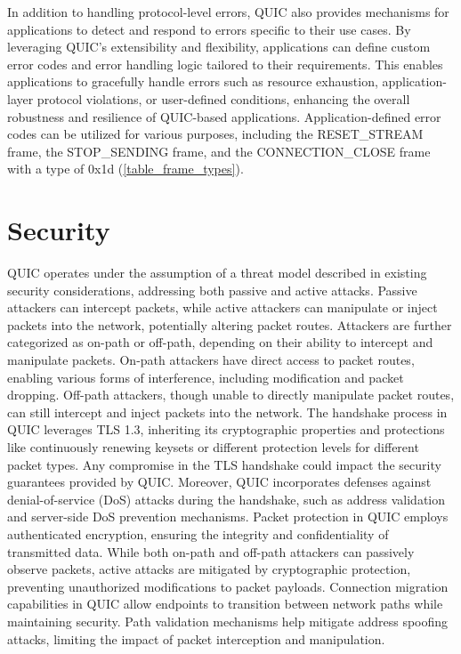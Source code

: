 In addition to handling protocol-level errors, QUIC also provides mechanisms for applications to detect and respond to errors specific to their use cases. By leveraging QUIC's extensibility and flexibility, applications can define custom error codes and error handling logic tailored to their requirements. This enables applications to gracefully handle errors such as resource exhaustion, application-layer protocol violations, or user-defined conditions, enhancing the overall robustness and resilience of QUIC-based applications. Application-defined error codes can be utilized for various purposes, including the RESET\_STREAM frame, the STOP\_SENDING frame, and the CONNECTION\_CLOSE frame with a type of 0x1d (\ref{table_frame_types}).

\section{Security} \label{security}

QUIC operates under the assumption of a threat model described in existing security considerations, addressing both passive and active attacks. Passive attackers can intercept packets, while active attackers can manipulate or inject packets into the network, potentially altering packet routes.
Attackers are further categorized as on-path or off-path, depending on their ability to intercept and manipulate packets. On-path attackers have direct access to packet routes, enabling various forms of interference, including modification and packet dropping. Off-path attackers, though unable to directly manipulate packet routes, can still intercept and inject packets into the network.
The handshake process in QUIC leverages TLS 1.3, inheriting its cryptographic properties and protections like continuously renewing keysets or different protection levels for different packet types. Any compromise in the TLS handshake could impact the security guarantees provided by QUIC. Moreover, QUIC incorporates defenses against denial-of-service (DoS) attacks during the handshake, such as address validation and server-side DoS prevention mechanisms.
Packet protection in QUIC employs authenticated encryption, ensuring the integrity and confidentiality of transmitted data. While both on-path and off-path attackers can passively observe packets, active attacks are mitigated by cryptographic protection, preventing unauthorized modifications to packet payloads.
Connection migration capabilities in QUIC allow endpoints to transition between network paths while maintaining security. Path validation mechanisms help mitigate address spoofing attacks, limiting the impact of packet interception and manipulation.

